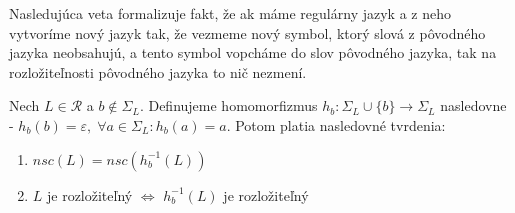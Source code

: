 Nasledujúca veta formalizuje fakt, že ak máme regulárny jazyk a z neho vytvoríme nový jazyk tak, že vezmeme nový symbol, ktorý slová z pôvodného jazyka neobsahujú, a tento symbol \glqq{} vopcháme \grqq{} do slov pôvodného jazyka, tak na rozložiteľnosti pôvodného jazyka to nič nezmení.

\begin{theorem}
\label{thm:new_symbol_in_language}
Nech $ L \in \mathscr{R} $ a $ b \notin \Sigma_L $. Definujeme homomorfizmus $ h_b: \Sigma_L \cup \lbrace b \rbrace \rightarrow \Sigma_L $ nasledovne - $ h_b(b) = \varepsilon, \; \forall a \in \Sigma_L: h_b(a) = a $. Potom platia nasledovné tvrdenia:
\begin{enumerate}[label=(\alph*)]
\item \label{thm:new_symbol_in_language_item_1} $ nsc(L) = nsc(h_{b}^{-1}(L)) $
\item \label{thm:new_symbol_in_language_item_2} $ L $ je rozložiteľný $ \Leftrightarrow $ $ h_{b}^{-1}(L) $ je rozložiteľný
\end{enumerate}
\end{theorem}

